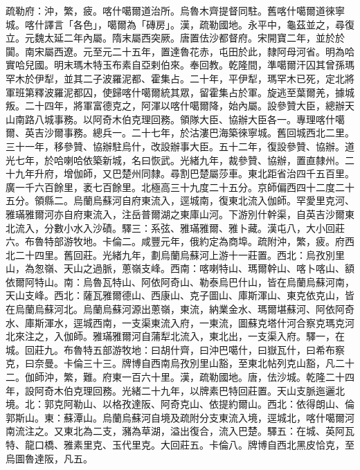 \begin{pinyinscope}
疏勒府：沖，繁，疲。喀什噶爾道治所。烏魯木齊提督同駐。舊喀什噶爾道徠寧城。喀什譯言「各色」，噶爾為「磚房」。漢，疏勒國地。永平中，龜茲並之，尋復立。元魏太延二年內屬。隋末屬西突厥。唐置佉沙都督府。宋開寶二年，並於於闐。南宋屬西遼。元至元二十五年，置達魯花赤，屯田於此，隸阿母河省。明為哈實哈兒國。明末瑪木特玉布素自亞剌伯來。奉回教。乾隆間，準噶爾汗囚其曾孫瑪罕木於伊犁，並其二子波羅泥都、霍集占。二十年，平伊犁，瑪罕木已死，定北將軍班第釋波羅泥都囚，使歸喀什噶爾統其眾，留霍集占於軍。旋逃至葉爾羌，據城叛。二十四年，將軍富德克之，阿渾以喀什噶爾降，始內屬。設參贊大臣，總辦天山南路八城事務。以阿奇木伯克理回務。領隊大臣、協辦大臣各一。專理喀什噶爾、英吉沙爾事務。總兵一。二十七年，於沽漊巴海築徠寧城。舊回城西北二里。三十一年，移參贊、協辦駐烏什，改設辦事大臣。五十二年，復設參贊、協辦。道光七年，於哈喇哈依築新城，名曰恢武。光緒九年，裁參贊、協辦，置直隸州。二十九年升府，增伽師，又巴楚州同隸。尋割巴楚屬莎車。東北距省治四千五百里。廣一千六百餘里，袤七百餘里。北極高三十九度二十五分。京師偏西四十二度二十五分。領縣二。烏蘭烏蘇河自府東流入，逕城南，復東北流入伽師。罕愛里克河、雅璊雅爾河亦自府東流入，注岳普爾湖之東庫山河。下游別什幹渠，自英吉沙爾東北流入，分數小水入沙磧。驛三：系弦、雅璊雅爾、雅卜藏。漢屯八，大小回莊六。布魯特部游牧地。卡倫二。咸豐元年，俄約定為商埠。疏附沖，繁，疲。府西北二十四里。舊回莊。光緒九年，劃烏蘭烏蘇河上游十一莊置。西北：烏孜別里山，為怱嶺、天山之過脈，蔥嶺支峰。西南：喀喇特山、瑪爾幹山、喀卜喀山、額依爾阿特山。南：烏魯瓦特山、阿依阿奇山、勒泰烏巴什山，皆在烏蘭烏蘇河南，天山支峰。西北：薩瓦雅爾德山、西康山、克子圖山、庫斯渾山、東克依克山，皆在烏蘭烏蘇河北。烏蘭烏蘇河源出蔥嶺，東流，納業金水、瑪爾堪蘇河、阿依阿奇水、庫斯渾水，逕城西南，一支渠東流入府，一東流，圖蘇克塔什河合察克瑪克河北來注之，入伽師。雅璊雅爾河自蒲犁北流入，東北出，一支渠入府。驛一，在城。回莊九。布魯特五部游牧地：曰胡什齊，曰沖巴噶什，曰嶽瓦什，曰希布察克，曰奈曼。卡倫三十三。牌博自西南烏孜別里山豁，至東北帖列克山豁，凡二十二。伽師沖，繁，難。府東一百六十里。漢，疏勒國地。唐，佉沙城。乾隆二十四年，設阿奇木伯克理回務。光緒二十九年，以牌素巴特回莊置。天山支脈迤邐北境。北：郭克阿勒山、以格孜達阪、阿奇克山、依提約爾山。西北：依得朗山、倫郭斯山。東：蘇潭山。烏蘭烏蘇河自境及疏附分支東流入境，逕城北，喀什噶爾河南流注之。又東北為二支，瀦為草湖，溢出復合，流入巴楚。驛五：在城、英阿瓦特、龍口橋、雅素里克、玉代里克。大回莊五。卡倫八。牌博自西北黑皮恰克，至烏圖魯達阪，凡五。


\end{pinyinscope}
